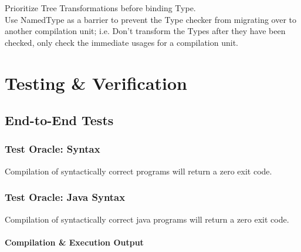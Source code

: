 \documentclass[12pt]{book}
\begin{document}
    \noindent Prioritize Tree Transformations before binding Type.\\
    \noindent Use NamedType as a barrier to prevent the Type checker from migrating over to another compilation unit;
    \noindent i.e. Don't transform the Types after they have been checked, only check the immediate usages for a compilation
    \noindent unit.


    \chapter{Testing \& Verification}


    \section{End-to-End Tests}


    \subsection{Test Oracle: Syntax} Compilation of syntactically correct programs will return a zero exit code.\\
    \subsection{Test Oracle: Java Syntax} Compilation of syntactically correct java programs will return a zero exit code.\\

    \subsubsection{Compilation \& Execution Output}
\end{document}
